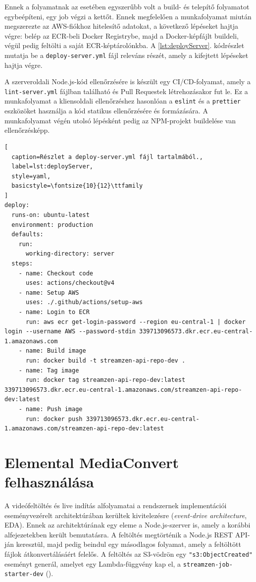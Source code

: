 Ennek a folyamatnak az esetében egyszerűbb volt a build- és telepítő folyamatot egybeépíteni, egy job végzi a kettőt. Ennek megfelelően a munkafolyamat miután megszerezte az AWS-fiókhoz hitelesítő adatokat, a következő lépéseket hajtja végre: belép az ECR-beli Docker Registrybe, majd a Docker-képfájlt buildeli, végül pedig feltölti a saját ECR-képtárolónkba. A \ref{lst:deployServer}. kódrészlet mutatja be a \verb|deploy-server.yml| fájl releváns részét, amely a kifejtett lépéseket hajtja végre.

A szerveroldali Node.js-kód ellenőrzésére is készült egy CI/CD-folyamat, amely a \verb|lint-server.yml| fájlban található és Pull Requestek létrehozásakor fut le. Ez a munkafolyamat a kliensoldali ellenőrzéshez hasonlóan a \verb|eslint| és a \verb|prettier| eszközöket használja a kód statikus ellenőrzésére és formázására. A munkafolyamat végén utolsó lépésként pedig az NPM-projekt buildelése van ellenőrzésképp.

\begin{minipage}{0.92\textwidth}
  \begin{lstlisting}[
  caption=Részlet a deploy-server.yml fájl tartalmából.,
  label=lst:deployServer,
  style=yaml,
  basicstyle=\fontsize{10}{12}\ttfamily
]
deploy:
  runs-on: ubuntu-latest
  environment: production
  defaults:
    run:
      working-directory: server
  steps:
    - name: Checkout code
      uses: actions/checkout@v4
    - name: Setup AWS
      uses: ./.github/actions/setup-aws
    - name: Login to ECR
      run: aws ecr get-login-password --region eu-central-1 | docker login --username AWS --password-stdin 339713096573.dkr.ecr.eu-central-1.amazonaws.com
    - name: Build image
      run: docker build -t streamzen-api-repo-dev .
    - name: Tag image
      run: docker tag streamzen-api-repo-dev:latest 339713096573.dkr.ecr.eu-central-1.amazonaws.com/streamzen-api-repo-dev:latest
    - name: Push image
      run: docker push 339713096573.dkr.ecr.eu-central-1.amazonaws.com/streamzen-api-repo-dev:latest
\end{lstlisting}
\end{minipage}

\section{Elemental MediaConvert felhasználása}

A videófeltöltés és live indítás alfolyamatai a rendszernek implementációi eseményvezérelt architektúrában kerültek kivitelezésre (\emph{event-drive architecture}, EDA\cite{eda}). Ennek az architektúrának egy eleme a Node.js-szerver is, amely a korábbi alfejezetekben került bemutatásra. A feltöltés megtörténik a Node.js REST API-ján keresztül, majd pedig beindul egy másodlagos folyamat, amely a feltöltött fájlok átkonvertálásáért felelős. A feltöltés az S3-vödrön egy \verb|"s3:ObjectCreated"| eseményt generál, amelyet egy Lambda-függvény kap el, a \verb|streamzen-job-starter-dev| ().

